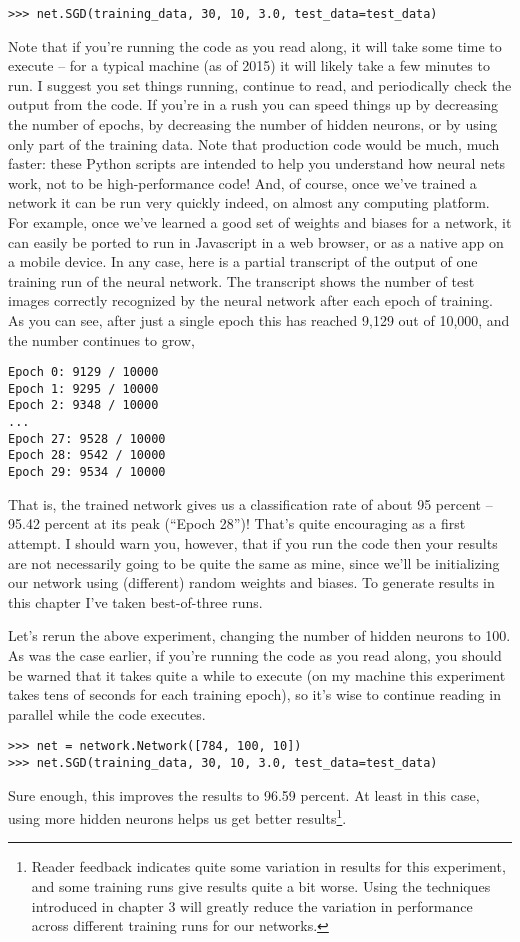 \documentclass[a4paper,twoside,10pt]{book}
\begin{document}
\begin{lstlisting}
>>> net.SGD(training_data, 30, 10, 3.0, test_data=test_data)
\end{lstlisting}
Note that if you're running the code as you read along, it will take some time to execute -- for a typical machine (as of 2015) it will likely take a few minutes to run. I suggest you set things running, continue to read, and periodically check the output from the code. If you're in a rush you can speed things up by decreasing the number of epochs, by decreasing the number of hidden neurons, or by using only part of the training data. Note that production code would be much, much faster: these Python scripts are intended to help you understand how neural nets work, not to be high-performance code! And, of course, once we've trained a network it can be run very quickly indeed, on almost any computing platform. For example, once we've learned a good set of weights and biases for a network, it can easily be ported to run in Javascript in a web browser, or as a native app on a mobile device. In any case, here is a partial transcript of the output of one training run of the neural network. The transcript shows the number of test images correctly recognized by the neural network after each epoch of training. As you can see, after just a single epoch this has reached 9,129 out of 10,000, and the number continues to grow,
\begin{lstlisting}			
Epoch 0: 9129 / 10000
Epoch 1: 9295 / 10000
Epoch 2: 9348 / 10000
...
Epoch 27: 9528 / 10000
Epoch 28: 9542 / 10000
Epoch 29: 9534 / 10000
\end{lstlisting}
That is, the trained network gives us a classification rate of about 95 percent -- 95.42 percent at its peak (``Epoch 28'')! That's quite encouraging as a first attempt. I should warn you, however, that if you run the code then your results are not necessarily going to be quite the same as mine, since we'll be initializing our network using (different) random weights and biases. To generate results in this chapter I've taken best-of-three runs.

Let's rerun the above experiment, changing the number of hidden neurons to 100. As was the case earlier, if you're running the code as you read along, you should be warned that it takes quite a while to execute (on my machine this experiment takes tens of seconds for each training epoch), so it's wise to continue reading in parallel while the code executes.
\begin{lstlisting}
>>> net = network.Network([784, 100, 10])
>>> net.SGD(training_data, 30, 10, 3.0, test_data=test_data)
\end{lstlisting}
Sure enough, this improves the results to 96.59 percent. At least in this case, using more hidden neurons helps us get better results\footnote{Reader feedback indicates quite some variation in results for this experiment, and some training runs give results quite a bit worse. Using the techniques introduced in chapter 3 will greatly reduce the variation in performance across different training runs for our networks.}.
\end{document}

